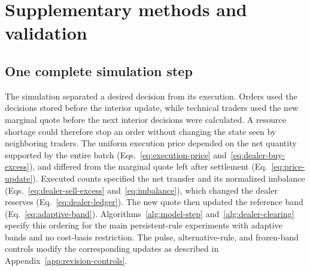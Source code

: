 \section{Supplementary methods and validation}
\label{app:supplement}
\setcounter{algorithm}{0}
\renewcommand{\thealgorithm}{S\arabic{algorithm}}

\subsection{One complete simulation step}

The simulation separated a desired decision from its execution. Orders
used the decisions stored before the interior update, while technical
traders used the new marginal quote before the next interior decisions
were calculated. A resource shortage could therefore stop an order
without changing the state seen by neighboring traders. The uniform
execution price depended on the net quantity supported by the entire
batch (Eqs.~\ref{eq:execution-price} and~\ref{eq:dealer-buy-excess}), and
differed from the marginal quote left after settlement
(Eq.~\ref{eq:price-update}). Executed counts specified the net transfer
and its normalized imbalance (Eqs.~\ref{eq:dealer-sell-excess}
and~\ref{eq:imbalance}), which changed the dealer reserves
(Eq.~\ref{eq:dealer-ledger}). The new quote then updated the reference
band (Eq.~\ref{eq:adaptive-band}).
Algorithms~\ref{alg:model-step} and~\ref{alg:dealer-clearing} specify this
ordering for the main persistent-rule experiments with adaptive bands
and no cost-basis restriction. The pulse, alternative-rule, and frozen-band
controls modify the corresponding updates as described in
Appendix~\ref{app:revision-controls}.

